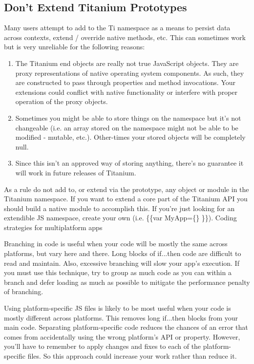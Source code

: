 \documentclass[11pt]{book}
\begin{document}
\subsection{Don't Extend Titanium Prototypes}
Many users attempt to add to the Ti namespace as a means to persist data across contexts, extend / override native methods, etc. This can sometimes work but is very unreliable for the following reasons:
\begin{enumerate}
	\item The Titanium end objects are really not true JavaScript objects. They are proxy representations of native operating system components. As such, they are constructed to pass through properties and method invocations. Your extensions could conflict with native functionality or interfere with proper operation of the proxy objects.
	\item Sometimes you might be able to store things on the namespace but it's not changeable (i.e. an array stored on the namespace might not be able to be modified - mutable, etc.). Other-times your stored objects will be completely null.
	\item Since this isn't an approved way of storing anything, there's no guarantee it will work in future releases of Titanium.
\end{enumerate}

As a rule do not add to, or extend via the prototype, any object or module in the Titanium namespace. If you want to extend a core part of the Titanium API you should build a native module to accomplish this. If you're just looking for an extendible JS namespace, create your own (i.e. \{\{var MyApp=\{\} \}\}).
Coding strategies for multiplatform apps

Branching in code is useful when your code will be mostly the same across platforms, but vary here and there. Long blocks of if...then code are difficult to read and maintain. Also, excessive branching will slow your app's execution. If you must use this technique, try to group as much code as you can within a branch and defer loading as much as possible to mitigate the performance penalty of branching.

Using platform-specific JS files is likely to be most useful when your code is mostly different across platforms. This removes long if...then blocks from your main code. Separating platform-specific code reduces the chances of an error that comes from accidentally using the wrong platform's API or property. However, you'll have to remember to apply changes and fixes to each of the platform-specific files. So this approach could increase your work rather than reduce it. 
\end{document}
